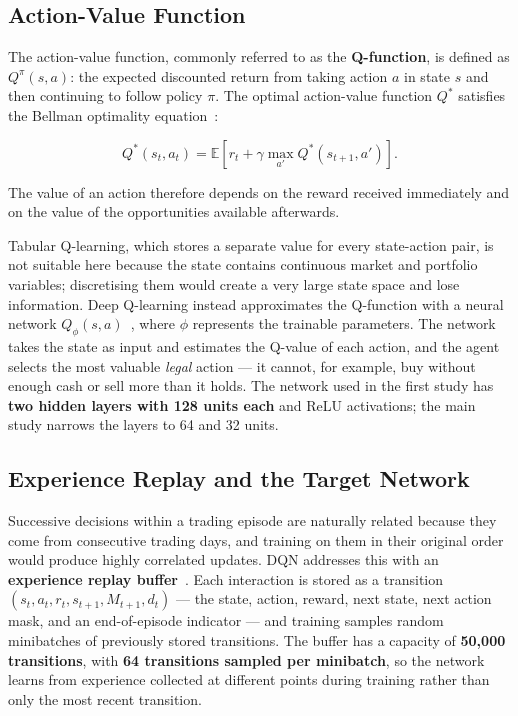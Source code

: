 \subsection{Action-Value Function}

The action-value function, commonly referred to as the
\textbf{Q-function}, is defined as \(Q^{\pi}(s,a)\): the expected
discounted return from taking action \(a\) in state \(s\) and then
continuing to follow policy \(\pi\). The optimal action-value function
\(Q^{*}\) satisfies the Bellman optimality
equation~\cite{bellman1957, watkins1992}:

\[Q^{*}\left( s_{t},a_{t} \right) = \mathbb{E}\left\lbrack r_{t} + \gamma\max_{a'}{Q^{*}\left( s_{t + 1},a' \right)} \right\rbrack.\]

The value of an action therefore depends on the reward received
immediately and on the value of the opportunities available afterwards.

Tabular Q-learning, which stores a separate value for every state-action
pair, is not suitable here because the state contains continuous market
and portfolio variables; discretising them would create a very large
state space and lose information. Deep Q-learning instead approximates
the Q-function with a neural network \(Q_{\phi}(s,a)\)~\cite{mnih2015},
where \(\phi\) represents the trainable parameters. The network takes
the state as input and estimates the Q-value of each action, and the
agent selects the most valuable \emph{legal} action --- it cannot, for
example, buy without enough cash or sell more than it holds. The network
used in the first study has \textbf{two hidden layers with 128 units
each} and ReLU activations; the main study narrows the layers to 64 and
32 units.

\subsection{Experience Replay and the Target Network}

Successive decisions within a trading episode are naturally related
because they come from consecutive trading days, and training on them in
their original order would produce highly correlated updates. DQN
addresses this with an \textbf{experience replay
buffer}~\cite{lin1992, mnih2015}. Each interaction is stored as a
transition
\(\left( s_{t},a_{t},r_{t},s_{t + 1},M_{t + 1},d_{t} \right)\) --- the
state, action, reward, next state, next action mask, and an
end-of-episode indicator --- and training samples random minibatches of
previously stored transitions. The buffer has a capacity of
\textbf{50,000 transitions}, with \textbf{64 transitions sampled per
minibatch}, so the network learns from experience collected at different
points during training rather than only the most recent transition.


